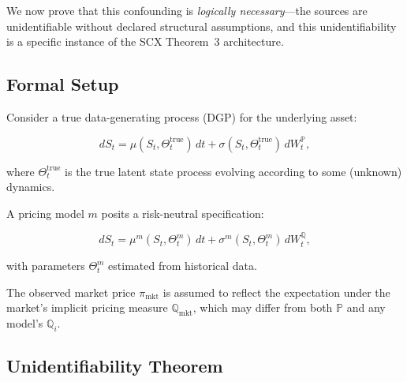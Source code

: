 \documentclass[11pt,a4paper]{article}
\theoremstyle{plain}
\theoremstyle{definition}
\theoremstyle{remark}
\newcommand{\SCX}{\textsc{SCX}}
\newcommand{\riskneutral}{\mathbb{Q}}
\newcommand{\physical}{\mathbb{P}}
\begin{document}
We now prove that this confounding is \emph{logically necessary}---the sources are unidentifiable without declared structural assumptions, and this unidentifiability is a specific instance of the \SCX{} Theorem~3 architecture.

\subsection{Formal Setup}

Consider a true data-generating process (DGP) for the underlying asset:

\begin{equation}\label{eq:true_dgp}
  dS_t = \mu(S_t, \Theta_t^{\text{true}})\,dt + \sigma(S_t, \Theta_t^{\text{true}})\,dW_t^{\physical},
\end{equation}

where $\Theta_t^{\text{true}}$ is the true latent state process evolving according to some (unknown) dynamics.

A pricing model $m$ posits a risk-neutral specification:

\begin{equation}\label{eq:model_dgp}
  dS_t = \mu^m(S_t, \Theta_t^m)\,dt + \sigma^m(S_t, \Theta_t^m)\,dW_t^{\riskneutral},
\end{equation}

with parameters $\Theta_t^m$ estimated from historical data.

The observed market price $\pi_{\text{mkt}}$ is assumed to reflect the expectation under the market's implicit pricing measure $\riskneutral_{\text{mkt}}$, which may differ from both $\physical$ and any model's $\riskneutral_i$.

\subsection{Unidentifiability Theorem}
\end{document}
